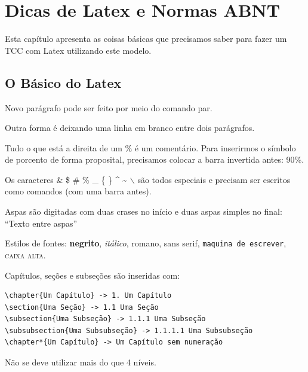 \chapter{Dicas de Latex e Normas ABNT}
Esta capítulo apresenta as coisas básicas que precisamos saber para fazer um TCC com Latex utilizando este modelo.

\section{O Básico do Latex}
Novo parágrafo pode ser feito por meio do comando par. \par
Outra forma é deixando uma linha em branco entre dois parágrafos.

Tudo o que está a direita de um \% é um comentário.
Para inserirmos o símbolo de porcento de forma proposital, precisamos colocar a barra invertida antes: 90\%.

Os caracteres \& \$ \# \% \_ \{ \} \^{} \~{} $\backslash$ são todos especiais e precisam ser escritos como comandos (com uma barra antes).

Aspas são digitadas com duas crases no início e duas aspas simples no final: ``Texto entre aspas''

Estilos de fontes: \textbf{negrito}, \textit{itálico}, \textrm{romano}, \textsf{sans serif}, \texttt{maquina de escrever}, \textsc{caixa alta}.

Capítulos, seções e subseções são inseridas com:
\begin{verbatim}
\chapter{Um Capítulo} -> 1. Um Capítulo
\section{Uma Seção} -> 1.1 Uma Seção
\subsection{Uma Subseção} -> 1.1.1 Uma Subseção
\subsubsection{Uma Subsubseção} -> 1.1.1.1 Uma Subsubseção
\chapter*{Um Capítulo} -> Um Capítulo sem numeração
\end{verbatim}
Não se deve utilizar mais do que 4 níveis.

